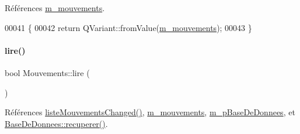 Références \hyperlink{class_mouvements_a5de7bbf3118ba8257e270011f2edf152}{m\+\_\+mouvements}.


\begin{DoxyCode}
00041 \{
00042     \textcolor{keywordflow}{return} QVariant::fromValue(\hyperlink{class_mouvements_a5de7bbf3118ba8257e270011f2edf152}{m\_mouvements});
00043 \}
\end{DoxyCode}
\mbox{\label{class_mouvements_a1d8306c0672efe509e71d2bdbd60208b}} 
\paragraph{\texorpdfstring{lire()}{lire()}}
{\footnotesize\ttfamily bool Mouvements\+::lire (\begin{DoxyParamCaption}{ }\end{DoxyParamCaption})}



Références \hyperlink{class_mouvements_af7abb930cc252388d03b74b144b83084}{liste\+Mouvements\+Changed()}, \hyperlink{class_mouvements_a5de7bbf3118ba8257e270011f2edf152}{m\+\_\+mouvements}, \hyperlink{class_mouvements_a8cb8047917f2e94adf9798c40b618d31}{m\+\_\+p\+Base\+De\+Donnees}, et \hyperlink{class_base_de_donnees_a77539baad389f5acf754cd2cd452403e}{Base\+De\+Donnees\+::recuperer()}.



